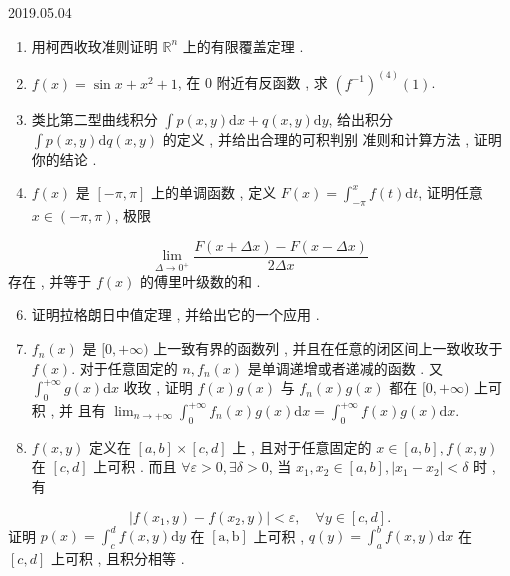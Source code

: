 \documentclass[10pt]{article}
\begin{document}
2019.05.04

\begin{enumerate}
  \item  用柯西收玫准则证明  $\mathbb{R}^{n}$  上的有限覆盖定理 .

  \item $f(x)=\sin x+x^{2}+1$,  在  0  附近有反函数 ,  求  $\left(f^{-1}\right)^{(4)}(1)$.

  \item  类比第二型曲线积分  $\int p(x, y) \mathrm{d} x+q(x, y) \mathrm{d} y$,  给出积分  $\int p(x, y) \mathrm{d} q(x, y)$  的定义 ,  并给出合理的可积判别   准则和计算方法 ,  证明你的结论 .

  \item $f(x)$  是  $[-\pi, \pi]$  上的单调函数 ,  定义  $F(x)=\int_{-\pi}^{x} f(t) \mathrm{d} t$,  证明任意  $x \in(-\pi, \pi)$,  极限 

\end{enumerate}
$$
\lim _{\Delta \rightarrow 0^{+}} \frac{F(x+\Delta x)-F(x-\Delta x)}{2 \Delta x}
$$
 存在 ,  并等于  $f(x)$  的傅里叶级数的和 .

\begin{enumerate}
  \setcounter{enumi}{5}
  \item  证明拉格朗日中值定理 ,  并给出它的一个应用 .

  \item $f_{n}(x)$  是  $[0,+\infty)$  上一致有界的函数列 ,  并且在任意的闭区间上一致收玫于  $f(x)$.  对于任意固定的  $n, f_{n}(x)$  是单调递增或者递减的函数 .  又  $\int_{0}^{+\infty} g(x) \mathrm{d} x$  收玫 ,  证明  $f(x) g(x)$  与  $f_{n}(x) g(x)$  都在  $[0,+\infty)$  上可积 ,  并   且有  $\lim _{n \rightarrow+\infty} \int_{0}^{+\infty} f_{n}(x) g(x) \mathrm{d} x=\int_{0}^{+\infty} f(x) g(x) \mathrm{d} x$.

  \item $f(x, y)$  定义在  $[a, b] \times[c, d]$  上 ,  且对于任意固定的  $x \in[a, b], f(x, y)$  在  $[c, d]$  上可积 .  而且  $\forall \varepsilon>0, \exists \delta>0$,  当  $x_{1}, x_{2} \in[a, b],\left|x_{1}-x_{2}\right|<\delta$  时 ,  有 

\end{enumerate}
$$
\left|f\left(x_{1}, y\right)-f\left(x_{2}, y\right)\right|<\varepsilon, \quad \forall y \in[c, d] .
$$
 证明  $p(x)=\int_{c}^{d} f(x, y) \mathrm{d} y$  在  $[\mathrm{a}, \mathrm{b}]$  上可积 , $q(y)=\int_{a}^{b} f(x, y) \mathrm{d} x$  在  $[c, d]$  上可积 ,  且积分相等 .
\end{document}
